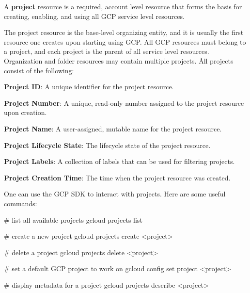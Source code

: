 \bd[Project]
A \textbf{project} resource is a required, account level resource that forms the basis for creating, enabling, and
using all GCP service level resources.
\ed

The project resource is the base-level organizing entity, and it is usually the first resource one creates upon starting
using GCP. All GCP resources must belong to a project, and each project is the parent of all service level resources.
Organization and folder resources may contain multiple projects. \v

All projects consist of the following:
\bit
\item \textbf{Project ID}: A unique identifier for the project resource.
\item \textbf{Project Number}: A unique, read-only number assigned to the project resource upon creation.
\item \textbf{Project Name}: A user-assigned, mutable name for the project resource.
\item \textbf{Project Lifecycle State}: The lifecycle state of the project resource.
\item \textbf{Project Labels}: A collection of labels that can be used for filtering projects.
\item \textbf{Project Creation Time}: The time when the project resource was created.
\eit


One can use the GCP SDK to interact with projects. Here are some useful commands:

\begin{bash}
# list all available projects
gcloud projects list
\end{bash}

\begin{bash}
# create a new project
gcloud projects create <project>
\end{bash}

\begin{bash}
# delete a project
gcloud projects delete <project>
\end{bash}

\begin{bash}
# set a default GCP project to work on
gcloud config set project <project>
\end{bash}

\begin{bash}
# display metadata for a project
gcloud projects describe <project>
\end{bash}

